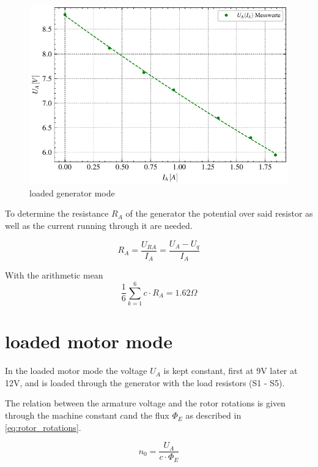 \documentclass[conference]{IEEEtran}
\begin{document}
\begin{figure}[htbp]
    \centering
    \includegraphics[width=\columnwidth]{plots/4.2_Belasteter_Generator_4000.pdf}
    \caption{loaded generator mode}
    \label{fig:load_generator_mode}
\end{figure}

To determine the resistance $R_A$ of the generator the potential over said
resistor as well as the current running through it are needed.

\begin{equation} \label{eq:R_A_resistance}
    R_A = \frac{U_{RA}}{I_A} = \frac{U_A - U_q}{I_A}
\end{equation}

With the arithmetic mean
\begin{equation}
    \frac{1}{6} \sum\limits_{k = 1}^{6} c \cdot R_A = 1.62 \Omega
\end{equation}


\section{loaded motor mode}
In the loaded motor mode the voltage $U_A$ is kept constant, first at 9V later
at 12V, and is loaded through the generator with the load resistors (S1 - S5).

The relation between the armature voltage and the rotor rotations is given
through the machine constant $c$and the flux $ \Phi_E$ as described in \ref{eq:rotor_rotations}.

\begin{equation} \label{eq:rotor_rotations}
    n_0 = \frac{U_A}{c \cdot \Phi_E}
\end{equation}
\end{document}
